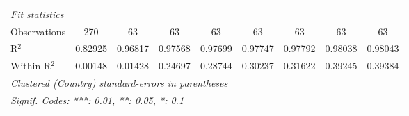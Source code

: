 \begin{table}[htbp]
\begin{tabular}{lcccccccc}
      \midrule
      \emph{Fit statistics}\\
      Observations                                                                      & 270      & 63       & 63             & 63             & 63              & 63              & 63             & 63\\  
      R$^2$                                                                             & 0.82925  & 0.96817  & 0.97568        & 0.97699        & 0.97747         & 0.97792         & 0.98038        & 0.98043\\  
      Within R$^2$                                                                      & 0.00148  & 0.01428  & 0.24697        & 0.28744        & 0.30237         & 0.31622         & 0.39245        & 0.39384\\  
      \midrule \midrule
      \multicolumn{9}{l}{\emph{Clustered (Country) standard-errors in parentheses}}\\
      \multicolumn{9}{l}{\emph{Signif. Codes: ***: 0.01, **: 0.05, *: 0.1}}\\
   \end{tabular}
\end{table}


